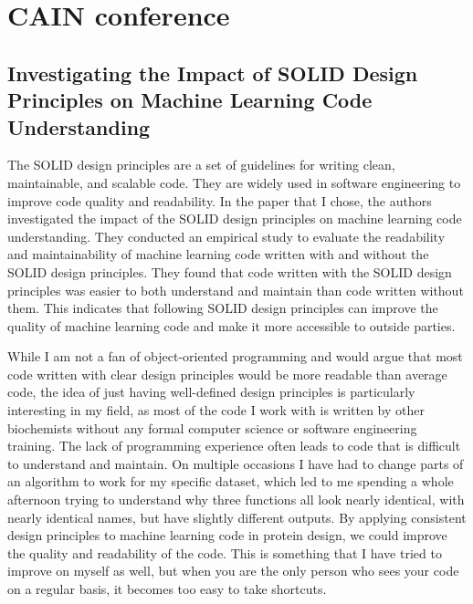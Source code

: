 \documentclass[a4paper, 11pt]{article} %
\begin{document}

\section*{CAIN conference}

\subsection*{Investigating the Impact of SOLID Design Principles on Machine Learning Code Understanding
\cite{cabralInvestigatingImpactSOLID2024}}

The SOLID design principles are a set of guidelines for writing clean, maintainable, and scalable code. They are widely used in software engineering to improve code quality and readability. In the paper that I chose, the authors investigated the impact of the SOLID design principles on machine learning code understanding. They conducted an empirical study to evaluate the readability and maintainability of machine learning code written with and without the SOLID design principles. They found that code written with the SOLID design principles was easier to both understand and maintain than code written without them. This indicates that following SOLID design principles can improve the quality of machine learning code and make it more accessible to outside parties.

While I am not a fan of object-oriented programming and would argue that most code written with clear design principles would be more readable than average code, the idea of just having well-defined design principles is particularly interesting in my field, as most of the code I work with is written by other biochemists without any formal computer science or software engineering training. The lack of programming experience often leads to code that is difficult to understand and maintain. On multiple occasions I have had to change parts of an algorithm to work for my specific dataset, which led to me spending a whole afternoon trying to understand why three functions all look nearly identical, with nearly identical names, but have slightly different outputs. By applying consistent design principles to machine learning code in protein design, we could improve the quality and readability of the code. This is something that I have tried to improve on myself as well, but when you are the only person who sees your code on a regular basis, it becomes too easy to take shortcuts.
\end{document}
